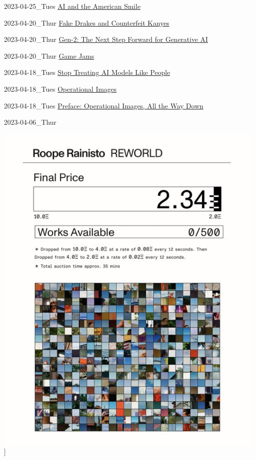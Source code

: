 \documentclass[
  letterpaper,
  DIV=11,
  numbers=noendperiod]{scrartcl}
\begin{document}
2023-04-25\_Tues
\href{https://medium.com/@socialcreature/ai-and-the-american-smile-76d23a0fbfaf}{AI
and the American Smile}

2023-04-20\_Thur
\href{https://www.buzzfeednews.com/article/chrisstokelwalker/ai-hip-hop-rap-music-drake-kanye-weeknd-rihanna-jay-z?fbclid=IwAR2GilfS-1q_2ZzhA-JgJawRULmSc2tcSATLVEri1Ux8SDDcmY9rTKy1ClY}{Fake
Drakes and Counterfeit Kanyes}

2023-04-20\_Thur \href{https://research.runwayml.com/gen2}{Gen-2: The
Next Step Forward for Generative AI}

2023-04-20\_Thur \href{https://itch.io/jams}{Game Jams}

2023-04-18\_Tues
\href{https://garymarcus.substack.com/p/stop-treating-ai-models-like-people}{Stop
Treating AI Models Like People}

2023-04-18\_Tues \href{https://operationalimages.cz/}{Operational
Images}

2023-04-18\_Tues
\href{https://jussiparikka.net/2022/02/16/operational-images-preface-in-the-forthcoming-book/}{Preface:
Operational Images, All the Way Down}

2023-04-06\_Thur

\href{https://day1.postphotography.xyz/}{\includegraphics{img/rr-auction.jpg}}{]}
\end{document}
